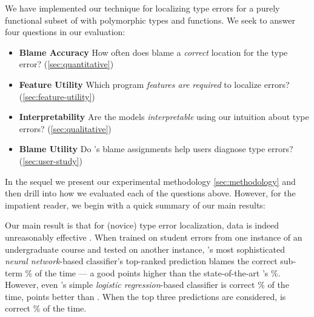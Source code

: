 \label{sec:evaluation}


We have implemented our technique for localizing type errors for a
purely functional subset of \ocaml with polymorphic types and functions.
%
We seek to answer four questions in our evaluation:
%
\begin{itemize}
\item \textbf{Blame Accuracy}
  How often does \toolname
  blame a \emph{correct}
  location for the type error?
  (\autoref{sec:quantitative})
\item \textbf{Feature Utility}
  Which program \emph{features are required}
  to localize errors?
   (\autoref{sec:feature-utility})
\item \textbf{Interpretability}
  Are the models \emph{interpretable} using
  our intuition about type errors?
  (\autoref{sec:qualitative})

\item \textbf{Blame Utility}
  Do \toolname's blame assignments help
  users diagnose type errors?
  (\autoref{sec:user-study})
\end{itemize}
%
%
In the sequel we present our experimental
methodology \autoref{sec:methodology} and
then drill into how we evaluated each of
the questions above.
%
However, for the impatient reader, we begin
with a quick summary of our main results:
%
%
%

Our main result is that for (novice) type error
localization, data is indeed unreasonably
effective \citep{halevy09}.
%
When trained on student errors from one
instance of an undergraduate course and
tested on another instance,
\toolname's most sophisticated
\emph{neural network}-based
classifier's top-ranked
prediction blames the correct
sub-term \HiddenFhTopOne\% of the time
--- a good \ToolnameWinSherrloc points
higher than the state-of-the-art
\sherrloc's \SherrlocTopOne\%.
%
However, even \toolname's simple
\emph{logistic regression}-based
classifier is correct \LinearTopOne\% of the time,
\ie \LinearWinSherrloc points better than \sherrloc.
%
When the top three predictions are considered,
\toolname is correct \HiddenFhTopThree\% of the time.

